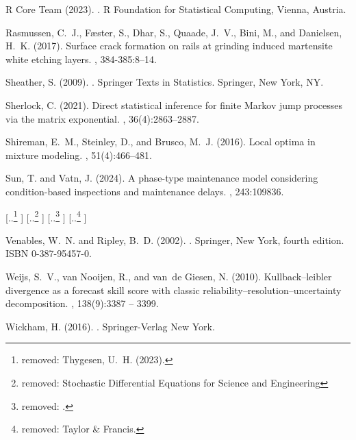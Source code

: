 \documentclass{article}
\providecommand{\DIFdel}[1]{{\protect\color{red} [..\footnote{removed: #1} ]}} %
\providecommand{\DIFdelbegin}{} %
\providecommand{\DIFdelend}{} %
\begin{document}
\begin{thebibliography}{}
{R Core Team} (2023).
.
\newblock R Foundation for Statistical Computing, Vienna, Austria.

Rasmussen, C.~J., Fæster, S., Dhar, S., Quaade, J.~V., Bini, M., and
  Danielsen, H.~K. (2017).
\newblock Surface crack formation on rails at grinding induced martensite white
  etching layers.
, 384-385:8--14.

Sheather, S. (2009).
.
\newblock Springer Texts in Statistics. Springer, New York, NY.

Sherlock, C. (2021).
\newblock Direct statistical inference for finite {Markov} jump processes via
  the matrix exponential.
, 36(4):2863--2887.

Shireman, E.~M., Steinley, D., and Brusco, M.~J. (2016).
\newblock Local optima in mixture modeling.
, 51(4):466--481.

Sun, T. and Vatn, J. (2024).
\newblock A phase-type maintenance model considering condition-based
  inspections and maintenance delays.
, 243:109836.
\DIFdelbegin %

\DIFdel{Thygesen, U.~H. (2023).
}%
\DIFdel{Stochastic Differential Equations for Science and Engineering}%
\DIFdel{.
}%
\DIFdel{Taylor \& Francis.
}\DIFdelend 

Venables, W.~N. and Ripley, B.~D. (2002).
.
\newblock Springer, New York, fourth edition.
\newblock ISBN 0-387-95457-0.

Weijs, S.~V., van Nooijen, R., and van~de Giesen, N. (2010).
\newblock Kullback–leibler divergence as a forecast skill score with classic
  reliability–resolution–uncertainty decomposition.
, 138(9):3387 -- 3399.

Wickham, H. (2016).
.
\newblock Springer-Verlag New York.


\end{thebibliography}
\end{document}

